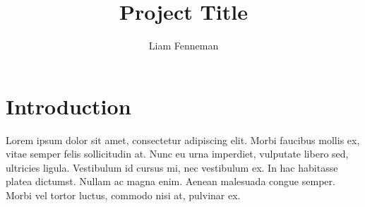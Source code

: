\documentclass[11pt, a4paper]{article}
\date{}
\begin{document}
\title{Project Title}
\author{Liam Fenneman}

\maketitle

\section{Introduction}

Lorem ipsum dolor sit amet, consectetur adipiscing elit. Morbi faucibus mollis
ex, vitae semper felis sollicitudin at. Nunc eu urna imperdiet, vulputate libero
sed, ultricies ligula. Vestibulum id cursus mi, nec vestibulum ex. In hac
habitasse platea dictumst. Nullam ac magna enim. Aenean malesuada congue semper.
Morbi vel tortor luctus, commodo nisi at, pulvinar ex.
\end{document}

